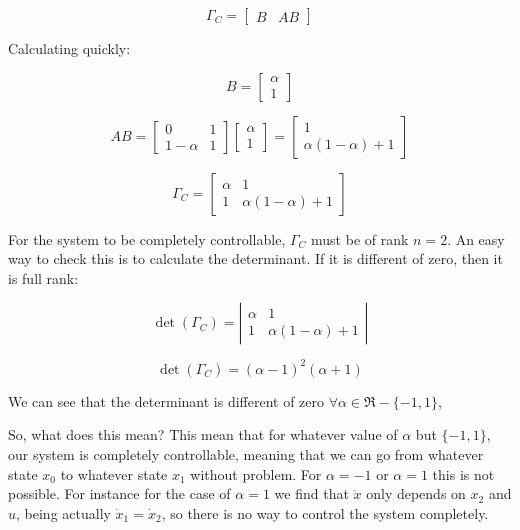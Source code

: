\documentclass[10pt,a4paper]{article}
\begin{document}
\[ \Gamma_{C} = 
\begin{bmatrix} B & AB \end{bmatrix}
\]

Calculating quickly:

\[ B =  
\begin{bmatrix}
\alpha \\
1
\end{bmatrix}
\]

\[ AB =  
\begin{bmatrix}
0 & 1\\
1 - \alpha & 1
\end{bmatrix}
\begin{bmatrix}
\alpha \\
1
\end{bmatrix} = 
\begin{bmatrix}
1  \\
\alpha(1-\alpha) + 1
\end{bmatrix} 
\]

\[ \Gamma_{C} = 
\begin{bmatrix}
\alpha & 1 \\
1 & \alpha(1-\alpha) + 1
\end{bmatrix} 
\]

For the system to be completely controllable, $\Gamma_{C}$ must be of rank $n =2$. An easy way to check this is to calculate the determinant. If it is different of zero, then it is full rank:

\[ \det (\Gamma_{C} ) = 
\left | \begin{matrix}
\alpha & 1 \\
1 & \alpha(1-\alpha) + 1
\end{matrix} \right |
\]

\[ \det (\Gamma_{C} ) = 
(\alpha - 1)^{2}(\alpha + 1)
\]

We can see that the determinant is different of zero $ \forall \alpha \in \Re - \{-1, 1\} $, 
\medskip

So, what does this mean? This mean that for whatever value of $\alpha$ but $\{-1,1\}$, our system  is completely controllable, meaning that we can go from whatever state $x_{0}$ to whatever state $x_{1}$ without problem. For $\alpha = -1$ or $\alpha = 1$ this is not possible. For instance for the case of $\alpha = 1$ we find that $\dot{x}$ only depends on $x_{2}$ and $u$, being actually $\dot{x}_{1} = \dot{x}_{2}$, so there is no way to control the system completely. 


\end{document}
